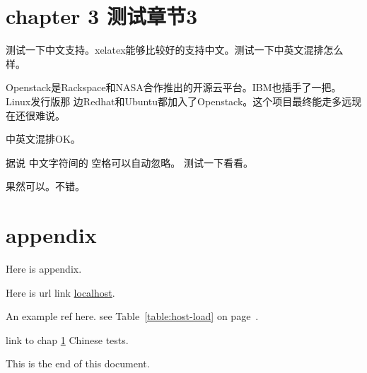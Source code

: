 \documentclass[a4paper,10pt,notitlepage,openany]{book}
\begin{document}
\chapter{chapter 3 测试章节3}\label{chap3}
测试一下中文支持。xelatex能够比较好的支持中文。测试一下中英文混排怎么样。

Openstack是Rackspace和NASA合作推出的开源云平台。IBM也插手了一把。Linux发行版那
边Redhat和Ubuntu都加入了Openstack。这个项目最终能走多远现在还很难说。

中英文混排OK。

据说 中文字符间的    空格可以自动忽略。    测试一下看看。

果然可以。不错。

\appendix
\chapter{appendix}
Here is appendix.

Here is url link \href{http://localhost/}{localhost}.

An example ref here.
see Table~\ref{table:host-load} on page~\pageref{table:host-load}.

link to chap \ref{chap3} Chinese tests.

This is the end of this document.
\end{document}
